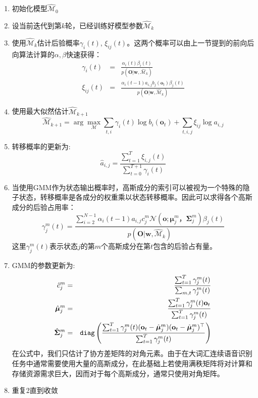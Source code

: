 \begin{enumerate}
    \item 初始化模型$\hat{\mathcal{M}}_0$
    \item 设当前迭代到第$k$轮，已经训练好模型参数$\hat{\mathcal{M}}_k$
    \item 使用$\hat{\mathcal{M}}_k$估计后验概率$\gamma_i(t)$, $\xi_{ij}(t)$。这两个概率可以由上一节提到的前向后向算法计算的$\alpha,\beta$快速获得：
    \begin{eqnarray}
    \gamma_i(t)&=&\frac{\alpha_i(t)\beta_i(t)}{p(\mathbf{O}|\mathbf{w}, \hat{\mathcal{M}}_k)} \\
    \xi_{ij}(t)&=&\frac{\alpha_i(t-1)a_{i,j}b_j(\mathbf{o}_t)\beta_j(t)}{p(\mathbf{O}|\mathbf{w}, \hat{\mathcal{M}}_k)}
    \end{eqnarray}
    \item 使用最大似然估计$\hat{\mathcal{M}}_{k+1}$
    \begin{equation}
        \hat{\mathcal{M}}_{k+1} = \arg \max_{\mathcal{M}} \sum_{t,i} \gamma_i(t)\log b_i(\mathbf{o}_t) + \sum_{t,i,j}\xi_{ij}\log a_{i,j}
    \end{equation}
    \item 转移概率的更新为:
    \begin{equation}
        \hat{a}_{i,j}=\frac{\sum_{t=1}^T \xi_{i,j}(t)}{\sum_{t=0}^{T+1} \gamma_i(t)}
    \end{equation}
    \item 当使用GMM作为状态输出概率时，高斯成分的索引可以被视为一个特殊的隐子状态，转移概率是各成分的权重乘以状态转移概率。因此可以求得各个高斯成分的后验占用率：
    \begin{equation}
        \gamma^m_j(t)=\frac{\sum_{i=2}^{N-1}\alpha_i(t-1)a_{i,j}c^m_{j}\mathcal{N}(\mathbf{o}; \bm{\mu}^m_j， \bm{\Sigma}^m_j)\beta_j(t)}{p(\mathbf{O}|\mathbf{w}, \hat{\mathcal{M}}_k)}   
    \end{equation}
    这里$\gamma^m_j(t)$表示状态$j$的第$m$个高斯成分在第$t$包含的后验占有量。
    \item GMM的参数更新为:
    \begin{eqnarray}
        \hat{c}^m_j &=& \frac{\sum_{t=1}^T \gamma^m_j(t)}{\sum_{m,t} \gamma^m_j(t)} \\
        \hat{\bm{\mu}}^m_j &=& \frac{\sum_{t=1}^T \gamma^m_j(t) \mathbf{o}_t}{\sum_{t=1}^T \gamma^m_j(t)} \\
        \hat{\bm{\Sigma}}^m_j &=& {\tt diag} \left( \frac{\sum_{t=1}^T \gamma^m_j(t) (\mathbf{o}_t-\hat{\bm{\mu}}^m_j)(\mathbf{o}_t-\hat{\bm{\mu}}^m_j)^{\top}}{\sum_{t=1}^T \gamma^m_j(t)} \right)
    \end{eqnarray}
    在公式中，我们只估计了协方差矩阵的对角元素。由于在大词汇连续语音识别任务中通常需要使用大量的高斯成分，在此基础上若使用满秩矩阵将对计算和存储资源需求巨大，因而对于每个高斯成分，通常只使用对角矩阵。
    \item 重复2直到收敛
\end{enumerate}
